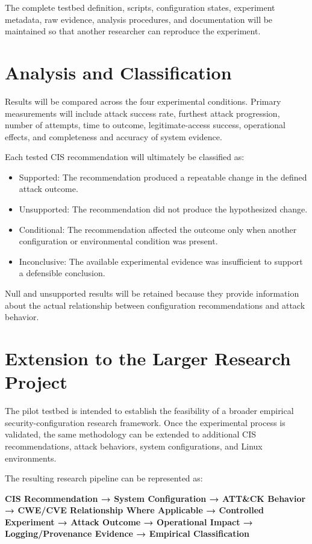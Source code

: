\documentclass[11pt]{article}
\begin{document}
The complete testbed definition, scripts, configuration states,
experiment metadata, raw evidence, analysis procedures, and
documentation will be maintained so that another researcher can
reproduce the experiment.
\section{Analysis and Classification}
\label{sec:orga3cfb7f}
Results will be compared across the four experimental conditions.
Primary measurements will include attack success rate, furthest attack
progression, number of attempts, time to outcome, legitimate-access
success, operational effects, and completeness and accuracy of system
evidence.

Each tested CIS recommendation will ultimately be classified as:

\begin{itemize}
\item Supported: The recommendation produced a repeatable change in the
defined attack outcome.
\item Unsupported: The recommendation did not produce the hypothesized
change.
\item Conditional: The recommendation affected the outcome only when another
configuration or environmental condition was present.
\item Inconclusive: The available experimental evidence was insufficient to
support a defensible conclusion.
\end{itemize}

Null and unsupported results will be retained because they provide
information about the actual relationship between configuration
recommendations and attack behavior.
\section{Extension to the Larger Research Project}
\label{sec:orgbe969b8}
The pilot testbed is intended to establish the feasibility of a broader
empirical security-configuration research framework. Once the
experimental process is validated, the same methodology can be extended
to additional CIS recommendations, attack behaviors, system
configurations, and Linux environments.

The resulting research pipeline can be represented as:

\textbf{CIS Recommendation → System Configuration → ATT\&CK Behavior → CWE/CVE
Relationship Where Applicable → Controlled Experiment → Attack Outcome →
Operational Impact → Logging/Provenance Evidence → Empirical
Classification}
\end{document}
